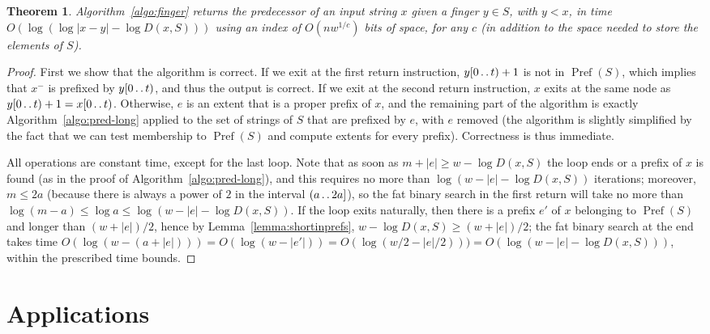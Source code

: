\documentclass[a4paper,11pt]{article}
\newtheorem{theorem}{Theorem}[section]
\newcommand{\?}{\mskip1.5mu}
\def\..{\,\mathpunct{\ldotp\ldotp}} %
\DeclareMathOperator{\Pref}{Pref}
\begin{document}
\begin{theorem}
\label{th:finger}
Algorithm~\ref{algo:finger} returns the predecessor of an input string $x$ given
a finger $y\in S$, with $y<x$, in time $O(\log(\log|x-y|-\log D(x,S)))$ using an 
index of $O(n w^{1/c})$ bits 
of space, for any $c$ (in addition to the space needed to store the elements of $S$).
\end{theorem}
\begin{proof}
First we show that the algorithm is correct. 
If we exit at the first return instruction, $y[0\..t)+1$ is
not in $\Pref(S)$, which implies that $x^-$ is prefixed by $y[0\..t)$, and thus
the output is correct. If we exit at the second return instruction, $x$
exits at the same node as $y[0\..t)+1=x[0\..t)$. Otherwise, $e$ is an extent
that is a proper prefix of $x$, and the remaining part of the algorithm
is exactly Algorithm~\ref{algo:pred-long} applied to the set of strings of $S$ 
that are prefixed by $e$, with $e$ removed (the algorithm is slightly
simplified by the fact that we can test membership to $\Pref(S)$ and compute
extents for every prefix). Correctness is thus immediate.

All operations are constant time, except for the last loop. Note that as soon as
$m+|e|\geq w-\log D(x,S)$ the loop ends or a prefix of $x$ is found (as in the
proof of Algorithm~\ref{algo:pred-long}), and this requires no more than $\log(w-|e|-\log
D(x,S))$ iterations; moreover, $m\leq 2a$ (because there is always
a power of $2$ in the interval $(a\..2a]$), so the fat binary search in the first
return will take no more than $\log(m-a)\leq \log a\leq \log (w-|e|-\log D(x,S))$.
If the loop exits naturally, then there is a prefix $e'$ of $x$ belonging
to $\Pref(S)$ and longer than $(w+|e|)/2$, hence by
Lemma~\ref{lemma:shortinprefs}, $w-\log D(x,S)\geq (w+|e|)/2$; the fat binary search at the
end takes time $O(\log (w-(a+|e|)))=O(\log (w-|e'|))=O(\log( w/2 -
|e|/2)))=O(\log(w-|e|-\log D(x,S)))$, within the prescribed time bounds.
\end{proof}

\section{Applications}
\end{document}

